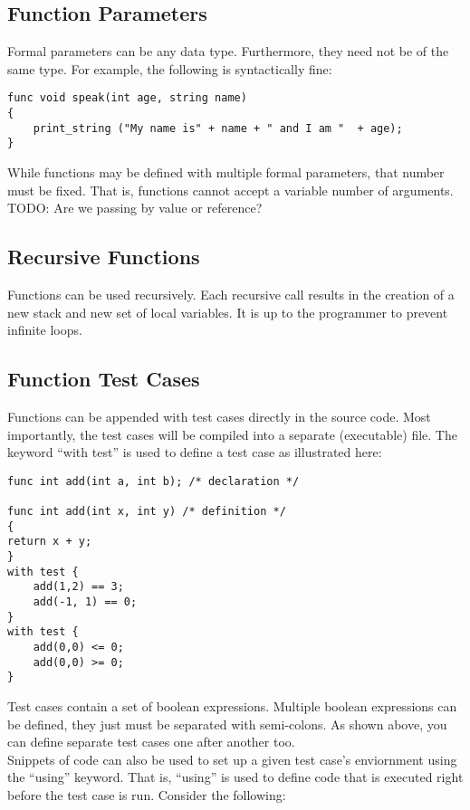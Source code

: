 \documentclass{article}
\begin{document}
\subsection{Function Parameters}
Formal parameters can be any data type. Furthermore, they need not be of the same type. For example, the following is syntactically fine:

\begin{lstlisting}
func void speak(int age, string name)
{
	print_string ("My name is" + name + " and I am "  + age);
}
\end{lstlisting}
While functions may be defined with multiple formal parameters, that number must be fixed. That is, functions cannot accept a variable number of arguments. 
\\
TODO: Are we passing by value or reference?


\subsection{Recursive Functions}

Functions can be used recursively. Each recursive call results in the creation of a new stack and new set of local variables. It is up to the programmer to prevent infinite loops. 

\subsection{Function Test Cases}
Functions can be appended with test cases directly in the source code. Most importantly, the test cases will be compiled into a separate (executable) file. The keyword ``with test'' is used to define a test case as illustrated here:

\begin{lstlisting}
func int add(int a, int b); /* declaration */

func int add(int x, int y) /* definition */
{
return x + y;
}
with test {
	add(1,2) == 3;
	add(-1, 1) == 0;
}
with test {
	add(0,0) <= 0;
	add(0,0) >= 0; 
}

\end{lstlisting}
Test cases contain a set of boolean expressions. Multiple boolean expressions can be defined, they just must be separated with semi-colons. As shown above, you can define separate test cases one after another too. \\ 
Snippets of code can also be used to set up a given test case's enviornment using the ``using'' keyword. That is, ``using'' is used to define code that is executed right before the test case is run. Consider the following:
\end{document}
